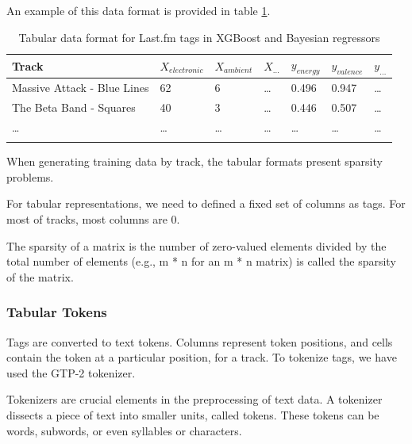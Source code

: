 \documentclass[sn-mathphys]{sn-jnl}%
\theoremstyle{thmstyleone}%
\theoremstyle{thmstyletwo}%
\theoremstyle{thmstylethree}%
\begin{document}
An example of this data format is provided in table \ref{tabular_tags_format}.

\begin{table}[h]
      \begin{center}
      \begin{minipage}{\textwidth}
      \caption{Tabular data format for Last.fm tags in XGBoost and Bayesian regressors}\label{tabular_tags_format}%
      \begin{tabular}{@{}lllllll@{}}
      \toprule
      Track                         & $X_{electronic}$ & $X_{ambient}$ & $X_{\dots}$ & $y_{energy}$ & $y_{valence}$ & $y_{\dots}$ \\
      \midrule
      Massive Attack - Blue Lines   & 62               & 6             &  \dots      & 0.496        & 0.947         & \dots  \\
      The Beta Band - Squares       & 40               & 3             &  \dots      & 0.446        & 0.507         & \dots  \\
      \dots                         & \dots            & \dots         &  \dots      & \dots        & \dots         & \dots  \\
      \botrule
      \end{tabular}
      \end{minipage}
      \end{center}
\end{table}

When generating training data by track, the tabular formats present sparsity problems.

For tabular representations, we need to defined a fixed set of columns as tags.
For most of tracks, most columns are 0.

The sparsity of a matrix is the number of zero-valued elements divided by the total number of elements
(e.g., m * n for an m * n matrix) is called the sparsity of the matrix.


\subsubsection{Tabular Tokens}

Tags are converted to text tokens. Columns represent token positions, and cells contain the token at a particular position, for a track.
To tokenize tags, we have used the GTP-2 tokenizer.

Tokenizers are crucial elements in the preprocessing of text data.
A tokenizer dissects a piece of text into smaller units, called tokens.
These tokens can be words, subwords, or even syllables or characters.
\end{document}

